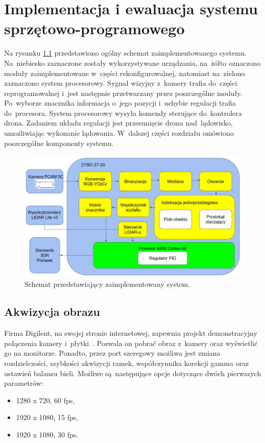 \chapter{Implementacja i ewaluacja systemu sprzętowo-programowego}
\label{cha:implementacja_systemu}

Na rysunku \ref{fig:system} przedstawiono ogólny schemat zaimplementowanego systemu. 
Na~niebiesko zaznaczone zostały wykorzystywane urządzania, na~żółto oznaczono moduły zaimplementowane w~części rekonfigurowalnej, natomiast na~zielono zaznaczono system procesorowy. 
Sygnał wizyjny z~kamery trafia do~części reprogramowalnej i~jest następnie przetwarzany przez poszczególne moduły. 
Po~wyborze znacznika informacja o~jego pozycji i~uchybie regulacji trafia do~procesora. 
System procesorowy wysyła komendy sterujące do~kontrolera drona. 
Zadaniem układu regulacji jest przesunięcie drona nad~lądowisko, umożliwiając wykonanie lądowania.
W~dalszej części rozdziału omówiono poszczególne komponenty systemu. 

\begin{figure}[h]
	\centering
	\includegraphics[width=\textwidth]{system.jpg}
	\caption{Schemat przedstawiający zaimplementowany system.}
	\label{fig:system}
\end{figure} 

\section{Akwizycja obrazu}
\label{sec:akwizycja}
Firma Digilent, na swojej stronie internetowej, zapewnia projekt demonstracyjny połączenia kamery i~płytki~\cite{projektPCAM}. 
Pozwala on pobrać obraz z~kamery oraz wyświetlić go na monitorze.
Ponadto, przez port szeregowy możliwa jest zmiana rozdzielczości, szybkości akwizycji ramek, współczynnika korekcji gamma oraz ustawień balansu bieli. 
Możliwe są~następujące opcje dotyczące dwóch pierwszych parametrów:
\begin{itemize}
	\item 1280 x 720, 60 fps,
	\item 1920 x 1080, 15 fps,
	\item 1920 x 1080, 30 fps.
\end{itemize}

